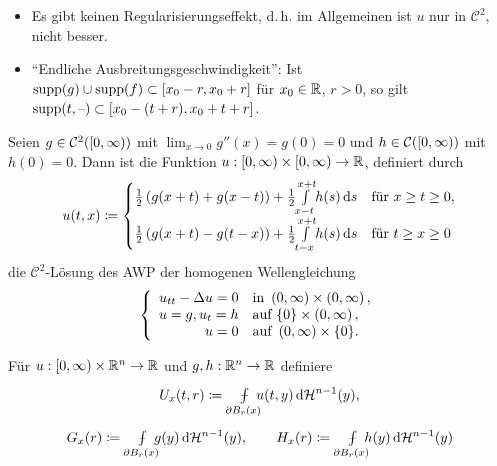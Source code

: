\documentclass{cheat-sheet}
\newcommand{\HM}{\mathcal{H}} %
\def\Xint#1{\mathchoice
   {\XXint\displaystyle\textstyle{#1}}%
   {\XXint\textstyle\scriptstyle{#1}}%
   {\XXint\scriptstyle\scriptscriptstyle{#1}}%
   {\XXint\scriptscriptstyle\scriptscriptstyle{#1}}%
   \!\int}
\def\XXint#1#2#3{{\setbox0=\hbox{$#1{#2#3}{\int}$}
     \vcenter{\hbox{$#2#3$}}\kern-.5\wd0}}
\def\dashint{\Xint-}
\newcommand{\mymvint}[2]{{\textstyle \dashint\limits_{#1}^{#2}}}
\newcommand{\MVInt}[4]{\mymvint{#1}{#2} #3 \,\d #4}
\begin{document}
\begin{bem}
  \begin{itemize}
    \item Es gibt keinen Regularisierungseffekt, d.\,h. im Allgemeinen ist $u$ nur in $\mathcal{C}^2$, nicht besser.
    \item "`Endliche Ausbreitungsgeschwindigkeit"': Ist $\mathop{\mathrm{supp}}(g) \cup \mathop{\mathrm{supp}}(f) \subset \left[ x_0 - r, x_0 + r \right]$ für $x_0 \in \mathbb{R}$, $r > 0$, so gilt $\mathop{\mathrm{supp}}(t, \text{--}) \subset \left[ x_0 - (t + r), x_0 + t + r \right]$.
  \end{itemize}
\end{bem}

\begin{kor}
  Seien $g \in \mathcal{C}^2(\left[ 0, \infty \right))$ mit $\lim_{x \to 0} g''(x) = g(0) = 0$ und $h \in \mathcal{C}(\left[ 0, \infty \right))$ mit $h(0) = 0$. Dann ist die Funktion $u : \left[ 0, \infty \right) \times \left[ 0, \infty \right) \to \mathbb{R}$, definiert durch
  \[
    u(t, x) \coloneqq \begin{cases}
      \tfrac{1}{2} \left( g(x + t) + g(x - t) \right) + \tfrac{1}{2} {\textstyle \int\limits_{x-t}^{x+t}} h(s) \,\mathrm{d} s & \text{für } x \geq t \geq 0,\\
      \tfrac{1}{2} \left( g(x + t) - g(t - x) \right) + \tfrac{1}{2} {\textstyle \int\limits_{t-x}^{x+t}} h(s) \,\mathrm{d} s & \text{für } t \geq x \geq 0
    \end{cases}
  \]
  die $\mathcal{C}^2$-Lösung des AWP der homogenen Wellengleichung
  \[
    \left\{ \begin{array}{rlll}
      u_{tt} - \Delta u = 0 & \text{in } \left( 0, \infty \right) \times \left( 0, \infty \right),\\
      u = g, u_t = h & \text{auf } \{ 0 \} \times \left( 0, \infty \right),\\
      u = 0 & \text{auf } \left( 0, \infty \right) \times \{ 0 \}.
    \end{array} \right.
  \]
\end{kor}


\begin{nota}
  Für $u : \left[ 0, \infty \right) \times \mathbb{R}^n \to \mathbb{R}$ und $g, h : \mathbb{R}^n \to \mathbb{R}$ definiere
  \[
    U_x(t, r) \coloneqq \quad \MVInt{\mathclap{\partial B_r(x)}}{}{\enspace u(t, y)}{\HM^{n-1}(y)},
  \]
  \[
    G_x(r) \coloneqq \quad \MVInt{\mathclap{\partial B_r(x)}}{}{\enspace g(y)}{\HM^{n-1}(y)},
    \qquad
    H_x(r) \coloneqq \quad \MVInt{\mathclap{\partial B_r(x)}}{}{\enspace h(y)}{\HM^{n-1}(y)}
  \]
\end{nota}
\end{document}
